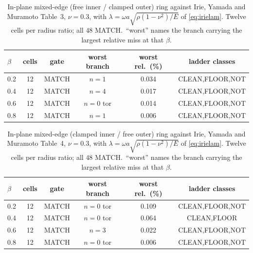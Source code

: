 \documentclass[11pt]{article}
\begin{document}
\begin{table}[htbp]\centering\small
\caption{In-plane mixed-edge (free inner / clamped outer) ring against Irie, Yamada and Muramoto Table~3, $\nu=0.3$, with $\lambda=\omega a\sqrt{\rho(1-\nu^{2})/E}$ of \eqref{eq:irielam}. Twelve cells per radius ratio; all $48$ MATCH.\ ``worst'' names the branch carrying the largest relative miss at that $\beta$.}
\label{tab:irie-t3}
\begin{tabular}{lccccc}
\toprule
$\beta$ & cells & gate & worst branch & worst rel.\ (\%) & ladder classes\\
\midrule
0.2 & 12 & MATCH & $n=1$ & 0.034 & CLEAN,FLOOR,NOT \\
0.4 & 12 & MATCH & $n=4$ & 0.017 & CLEAN,FLOOR,NOT \\
0.6 & 12 & MATCH & $n=0$ tor & 0.014 & CLEAN,FLOOR,NOT \\
0.8 & 12 & MATCH & $n=1$ & 0.006 & CLEAN,FLOOR,NOT \\
\bottomrule
\end{tabular}
\end{table}

\begin{table}[htbp]\centering\small
\caption{In-plane mixed-edge (clamped inner / free outer) ring against Irie, Yamada and Muramoto Table~4, $\nu=0.3$, with $\lambda=\omega a\sqrt{\rho(1-\nu^{2})/E}$ of \eqref{eq:irielam}. Twelve cells per radius ratio; all $48$ MATCH.\ ``worst'' names the branch carrying the largest relative miss at that $\beta$.}
\label{tab:irie-t4}
\begin{tabular}{lccccc}
\toprule
$\beta$ & cells & gate & worst branch & worst rel.\ (\%) & ladder classes\\
\midrule
0.2 & 12 & MATCH & $n=0$ tor & 0.109 & CLEAN,FLOOR,NOT \\
0.4 & 12 & MATCH & $n=0$ tor & 0.064 & CLEAN,FLOOR \\
0.6 & 12 & MATCH & $n=3$ & 0.022 & CLEAN,FLOOR,NOT \\
0.8 & 12 & MATCH & $n=0$ tor & 0.006 & CLEAN,FLOOR,NOT \\
\bottomrule
\end{tabular}
\end{table}
\end{document}

